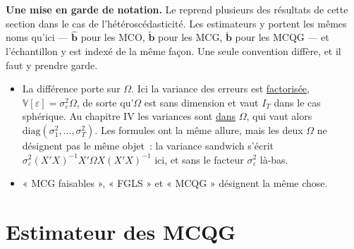 \documentclass[10pt]{beamer}
\begin{document}
\begin{notes}

  \textbf{Une mise en garde de notation.} Le  reprend plusieurs des
  résultats de cette section dans le cas de l'hétéroscédasticité. Les estimateurs y
  portent les mêmes noms qu'ici — $\hat{\mathbf b}$ pour les MCO, $\tilde{\mathbf b}$
  pour les MCG, $\breve{\mathbf b}$ pour les MCQG — et l'échantillon y est indexé de
  la même façon. Une seule convention diffère, et il faut y prendre garde.

  \bigskip

  \begin{itemize}

  \item[\dbend] La différence porte sur $\Omega$. Ici la variance des erreurs est
    \underline{factorisée}, $\mathbb V[\varepsilon]=\sigma_{\varepsilon}^2\Omega$, de
    sorte qu'$\Omega$ est sans dimension et vaut $I_T$ dans le cas sphérique. Au
    chapitre IV les variances sont \underline{dans} $\Omega$, qui vaut alors
    $\mathrm{diag}(\sigma_1^2,\dots,\sigma_T^2)$. Les formules ont la même allure, mais
    les deux $\Omega$ ne désignent pas le même objet~: la variance sandwich s'écrit
    $\sigma_{\varepsilon}^2(X'X)^{-1}X'\Omega X(X'X)^{-1}$ ici, et sans le facteur
    $\sigma_{\varepsilon}^2$ là-bas.\newline

  \item « MCG faisables », « FGLS » et « MCQG » désignent la même chose.

  \end{itemize}

\end{notes}


\section{Estimateur des MCQG}
\end{document}
